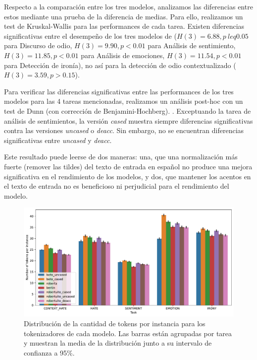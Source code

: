 Respecto a la comparación entre los tres modelos, analizamos las diferencias entre estos mediante una prueba de la diferencia de medias. Para ello, realizamos un test de Kruskal-Wallis para las performances de cada tarea. Existen diferencias significativas entre el desempeño de los tres modelos de \robertuito{} ($ H (3) = 6.88, p \ leq 0.05 $ para Discurso de odio, $ H (3) = 9.90 , p <0.01 $ para Análisis de sentimiento, $ H (3) = 11.85, p <0.01 $ para Análisis de emociones, $ H (3) = 11.54, p <0.01 $ para Detección de ironía), no así para la detección de odio contextualizado ($H(3)=3.59, p > 0.15$).

Para verificar las diferencias significativas entre las performances de los tres modelos para las 4 tareas mencionadas, realizamos un análisis post-hoc con un test de Dunn (con corrección de Benjamini-Hochberg). . Exceptuando la tarea de análisis de sentimientos, la versión \emph{cased} muestra siempre diferencias significativas contra las versiones \emph{uncased} o \emph{deacc}. Sin embargo, no se encuentran diferencias significativas entre \emph{uncased} y \emph{deacc}.

Este resultado puede leerse de dos maneras: una, que una normalización más fuerte (remover las tildes) del texto de entrada en español no produce una mejora significativa en el rendimiento de los modelos, y dos, que mantener los acentos en el texto de entrada no es beneficioso ni perjudicial para el rendimiento del modelo.

\begin{figure}
    \centering
    \includegraphics[width=\textwidth]{img/robertuito/length_tokens.pdf}
    \caption{Distribución de la cantidad de tokens por instancia para los tokenizadores de cada modelo. Las barras están agrupadas por tarea y muestran la media de la distribución junto a su intervalo de confianza a 95\%.}
    \label{fig:length_tokens}
\end{figure}

